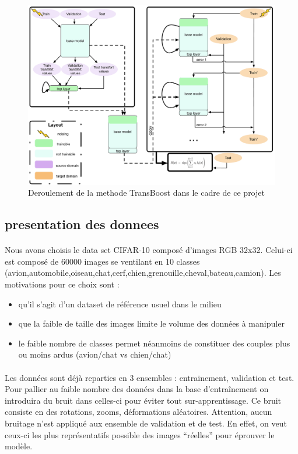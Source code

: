 \documentclass[11 pt]{article}
\begin{document}
\begin{figure}
  \includegraphics[width=\textwidth]{fig1.pdf}
  \caption{Deroulement de la methode TransBoost dans le cadre de ce projet}
  \label{figRes}
\end{figure}

\subsection{presentation des donnees}
\paragraph{}Nous avons choisis le data set CIFAR-10 composé d’images RGB 32x32. Celui-ci est composé de 60000 images se ventilant en 10 classes (avion,automobile,oiseau,chat,cerf,chien,grenouille,cheval,bateau,camion). Les motivations pour ce choix sont :\\ \medskip
\begin{itemize}
  \item qu’il s’agit d’un dataset de référence usuel dans le milieu
  \item que la faible de taille des images limite le volume des données à manipuler
  \item le faible nombre de classes permet néanmoins de constituer des couples plus ou moins ardus (avion/chat vs chien/chat)
\end{itemize}

\paragraph{}Les données sont déjà reparties en 3 ensembles : entrainement, validation et test. Pour pallier au faible nombre des données dans la base d’entraînement on introduira du bruit dans celles-ci pour éviter tout sur-apprentissage. Ce bruit consiste en des rotations, zooms, déformations aléatoires. Attention, aucun bruitage n’est appliqué aux ensemble de validation et de test. En effet, on veut ceux-ci les plus représentatifs possible des images “réelles” pour éprouver le modèle.
\end{document}
